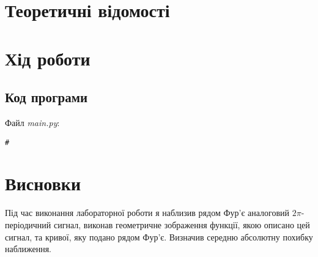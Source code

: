 \documentclass[oneside,14pt]{extarticle}
\begin{document}
\begin{normalsize}
	\section*{Теоретичні відомості}
	
	\section*{Хід роботи}	

	\subsection*{Код програми}
	Файл \textit{main.py}:
	{\small
		\begin{lstlisting}
#
		\end{lstlisting}
	}
	
	\section*{Висновки}
	Під час виконання лабораторної роботи я наблизив рядом Фур’є аналоговий $2\pi$- періодичний
	сигнал, виконав геометричне зображення функції, якою описано цей сигнал, та
	кривої, яку подано рядом Фур’є. Визначив середню абсолютну похибку
	наближення.
	    
\end{normalsize}
\end{document}
